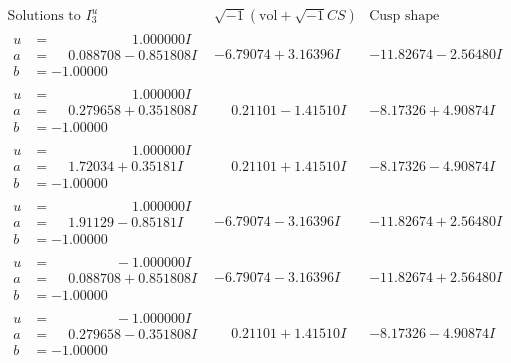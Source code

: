 \documentclass[1p]{elsarticle_modified}
\theoremstyle{definition}
\newcommand{\I}{\sqrt{-1}}
\begin{document}
$$\begin{array}{c|c|c}  
\text{Solutions to }I^u_{3}& \I (\text{vol} + \sqrt{-1}CS) & \text{Cusp shape}\\
 \hline 
\begin{aligned}
u &= \phantom{-0.000000 -}1.000000 I \\
a &= \phantom{-}0.088708 - 0.851808 I \\
b &= -1.00000\phantom{ +0.000000I}\end{aligned}
 & -6.79074 + 3.16396 I & -11.82674 - 2.56480 I \\ \hline\begin{aligned}
u &= \phantom{-0.000000 -}1.000000 I \\
a &= \phantom{-}0.279658 + 0.351808 I \\
b &= -1.00000\phantom{ +0.000000I}\end{aligned}
 & \phantom{-}0.21101 - 1.41510 I & -8.17326 + 4.90874 I \\ \hline\begin{aligned}
u &= \phantom{-0.000000 -}1.000000 I \\
a &= \phantom{-}1.72034 + 0.35181 I \\
b &= -1.00000\phantom{ +0.000000I}\end{aligned}
 & \phantom{-}0.21101 + 1.41510 I & -8.17326 - 4.90874 I \\ \hline\begin{aligned}
u &= \phantom{-0.000000 -}1.000000 I \\
a &= \phantom{-}1.91129 - 0.85181 I \\
b &= -1.00000\phantom{ +0.000000I}\end{aligned}
 & -6.79074 - 3.16396 I & -11.82674 + 2.56480 I \\ \hline\begin{aligned}
u &= \phantom{-0.000000 } -1.000000 I \\
a &= \phantom{-}0.088708 + 0.851808 I \\
b &= -1.00000\phantom{ +0.000000I}\end{aligned}
 & -6.79074 - 3.16396 I & -11.82674 + 2.56480 I \\ \hline\begin{aligned}
u &= \phantom{-0.000000 } -1.000000 I \\
a &= \phantom{-}0.279658 - 0.351808 I \\
b &= -1.00000\phantom{ +0.000000I}\end{aligned}
 & \phantom{-}0.21101 + 1.41510 I & -8.17326 - 4.90874 I \\ \hline\begin{aligned}

\end{aligned}
\end{array}$$
\end{document}
